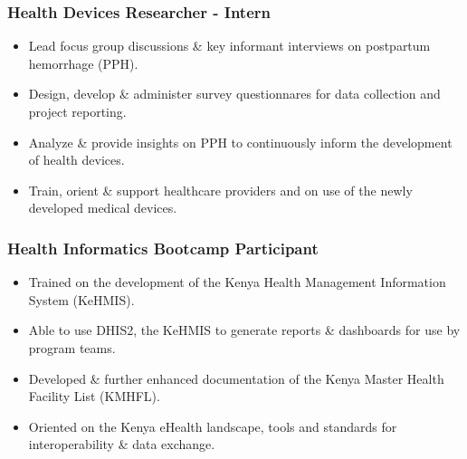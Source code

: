 \documentclass{brian_ats}
\begin{document}
\subsubsection{Health Devices Researcher - Intern}
\begin{itemize}
    \item Lead focus group discussions \& key informant interviews on postpartum hemorrhage (PPH).
    \item Design, develop \& administer survey questionnares for data collection and project reporting.
    \item Analyze \& provide insights on PPH to continuously inform the development of health devices.
    \item Train, orient \& support healthcare providers and on use of the newly developed medical devices.
\end{itemize}


\subsubsection{Health Informatics Bootcamp Participant}
\begin{itemize}
    \item Trained on the development of the Kenya Health Management Information System (KeHMIS).
    \item Able to use DHIS2, the KeHMIS  to generate reports \& dashboards for use by program teams.
    \item Developed \& further enhanced documentation of the Kenya  Master Health Facility List (KMHFL).
    \item Oriented on the Kenya eHealth landscape, tools and standards for interoperability \& data exchange. 
\end{itemize}
\end{document}
